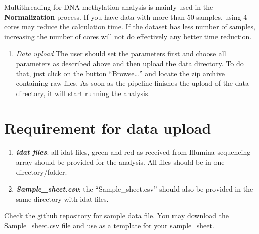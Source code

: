 \documentclass[
  a4paper,
  oneside,
  open=any]{scrreport}
\providecommand{\tightlist}{%
  \setlength{\itemsep}{0pt}\setlength{\parskip}{0pt}}\usepackage{longtable,booktabs,array}
\begin{document}
\begin{tcolorbox}[enhanced jigsaw, left=2mm, colback=white, breakable, leftrule=.75mm, coltitle=black, toprule=.15mm, rightrule=.15mm, colbacktitle=quarto-callout-note-color!10!white, title=\textcolor{quarto-callout-note-color}{\faInfo}\hspace{0.5em}{Note}, opacitybacktitle=0.6, colframe=quarto-callout-note-color-frame, bottomrule=.15mm, bottomtitle=1mm, toptitle=1mm, titlerule=0mm, opacityback=0, arc=.35mm]
Multithreading for DNA methylation analysis is mainly used in the
\textbf{Normalization} process. If you have data with more than 50
samples, using 4 cores may reduce the calculation time. If the dataset
has less number of samples, increasing the number of cores will not do
effectively any better time reduction.
\end{tcolorbox}

\begin{enumerate}
\def\labelenumi{\arabic{enumi}.}
\setcounter{enumi}{1}
\tightlist
\item
  \emph{Data upload} The user should set the parameters first and choose
  all parameters as described above and then upload the data directory.
  To do that, just click on the button ``Browse\ldots{}'' and locate the
  zip archive containing raw files. As soon as the pipeline finishes the
  upload of the data directory, it will start running the analysis.
\end{enumerate}

\hypertarget{requirement-for-data-upload}{%
\section{Requirement for data
upload}\label{requirement-for-data-upload}}

\begin{enumerate}
\def\labelenumi{\arabic{enumi}.}
\tightlist
\item
  \textbf{\emph{idat files}}: all idat files, green and red as received
  from Illumina sequencing array should be provided for the analysis.
  All files should be in one directory/folder.
\item
  \textbf{\emph{Sample\_sheet.csv}}: the ``Sample\_sheet.csv'' should
  also be provided in the same directory with idat files.
\end{enumerate}

\begin{tcolorbox}[enhanced jigsaw, left=2mm, colback=white, breakable, leftrule=.75mm, coltitle=black, toprule=.15mm, rightrule=.15mm, colbacktitle=quarto-callout-tip-color!10!white, title=\textcolor{quarto-callout-tip-color}{\faLightbulb}\hspace{0.5em}{Tip}, opacitybacktitle=0.6, colframe=quarto-callout-tip-color-frame, bottomrule=.15mm, bottomtitle=1mm, toptitle=1mm, titlerule=0mm, opacityback=0, arc=.35mm]
Check the
\href{https://github.com/JD2112/methylr/tree/main/data}{github}
repository for sample data file. You may download the Sample\_sheet.csv
file and use as a template for your sample\_sheet.
\end{tcolorbox}
\end{document}
